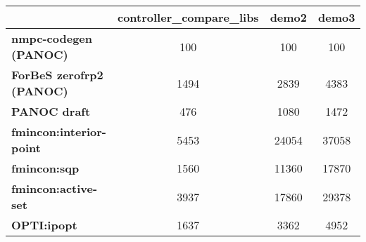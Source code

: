 \begin{tiny}\begin{tabular}{|l|c|c|c|}
\hline
&\textbf{controller_compare_libs}&\textbf{demo2}&\textbf{demo3}\\\hline
\textbf{nmpc-codegen (PANOC)}&100&100&100\\\hline
\textbf{ForBeS zerofrp2 (PANOC)}&1494&2839&4383\\\hline
\textbf{PANOC draft}&476&1080&1472\\\hline
\textbf{fmincon:interior-point}&5453&24054&37058\\\hline
\textbf{fmincon:sqp}&1560&11360&17870\\\hline
\textbf{fmincon:active-set}&3937&17860&29378\\\hline
\textbf{OPTI:ipopt}&1637&3362&4952\\\hline
\end{tabular}
\end{tiny}
